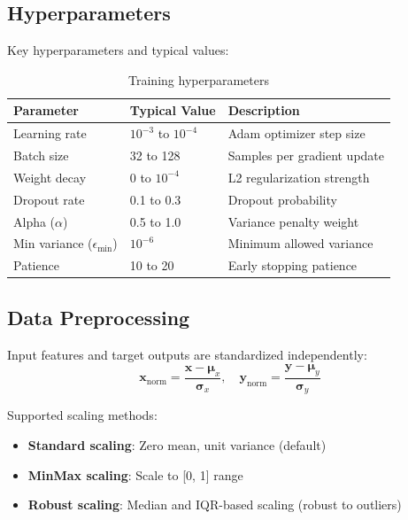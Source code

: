 \documentclass[11pt,a4paper]{article}
\begin{document}
\subsection{Hyperparameters}

Key hyperparameters and typical values:

\begin{table}[h]
\centering
\begin{tabular}{lll}
\toprule
\textbf{Parameter} & \textbf{Typical Value} & \textbf{Description} \\
\midrule
Learning rate & $10^{-3}$ to $10^{-4}$ & Adam optimizer step size \\
Batch size & 32 to 128 & Samples per gradient update \\
Weight decay & 0 to $10^{-4}$ & L2 regularization strength \\
Dropout rate & 0.1 to 0.3 & Dropout probability \\
Alpha ($\alpha$) & 0.5 to 1.0 & Variance penalty weight \\
Min variance ($\epsilon_{\min}$) & $10^{-6}$ & Minimum allowed variance \\
Patience & 10 to 20 & Early stopping patience \\
\bottomrule
\end{tabular}
\caption{Training hyperparameters}
\end{table}

\subsection{Data Preprocessing}

Input features and target outputs are standardized independently:
\begin{equation}
\mathbf{x}_{\text{norm}} = \frac{\mathbf{x} - \boldsymbol{\mu}_x}{\boldsymbol{\sigma}_x}, \quad
\mathbf{y}_{\text{norm}} = \frac{\mathbf{y} - \boldsymbol{\mu}_y}{\boldsymbol{\sigma}_y}
\end{equation}

Supported scaling methods:
\begin{itemize}
    \item \textbf{Standard scaling}: Zero mean, unit variance (default)
    \item \textbf{MinMax scaling}: Scale to [0, 1] range
    \item \textbf{Robust scaling}: Median and IQR-based scaling (robust to outliers)
\end{itemize}
\end{document}
